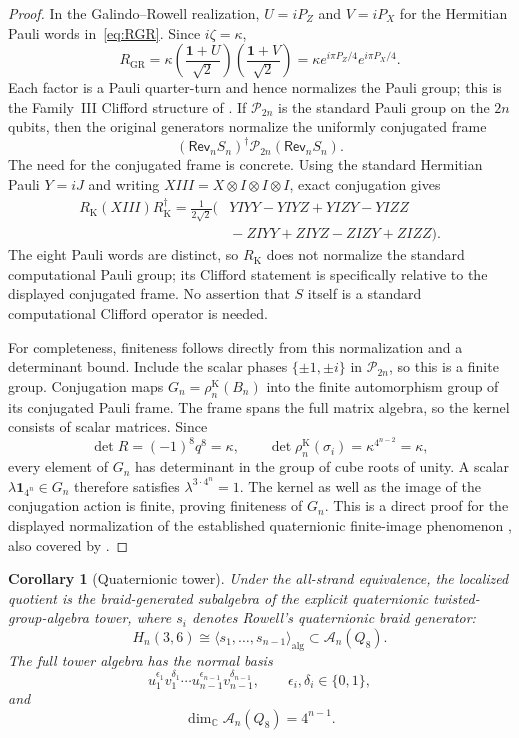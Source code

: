\documentclass[11pt]{article}
\newtheorem{corollary}[theorem]{Corollary}
\theoremstyle{remark}
\newcommand{\Id}{\mathbf 1}
\newcommand{\bbC}{\mathbb C}
\begin{document}
\begin{proof}
In the Galindo--Rowell realization, \(U=iP_Z\) and \(V=iP_X\) for the Hermitian
Pauli words in~\eqref{eq:RGR}.  Since \(i\zeta=\kappa\),
\[
  R_{\mathrm{GR}}
  =\kappa\left(\frac{\Id+U}{\sqrt2}\right)
             \left(\frac{\Id+V}{\sqrt2}\right)
  =\kappa e^{i\pi P_Z/4}e^{i\pi P_X/4}.
\]
Each factor is a Pauli quarter-turn and hence normalizes the Pauli group; this
is the Family~III Clifford structure of
\cite[Proposition~8.1]{GalindoRowell2026}.  If \(\mathcal P_{2n}\) is the
standard Pauli group on the \(2n\) qubits, then the original generators
normalize the uniformly conjugated frame
\[
  (\mathsf{Rev}_nS_n)^\dagger\mathcal P_{2n}(\mathsf{Rev}_nS_n).
\]
The need for the conjugated frame is concrete.  Using the standard Hermitian
Pauli \(Y=iJ\) and writing \(XIII=X\otimes I\otimes I\otimes I\), exact
conjugation gives
\[
\begin{aligned}
  R_{\mathrm K}(XIII)R_{\mathrm K}^\dagger
  =\frac1{2\sqrt2}\bigl(&YIYY-YIYZ+YIZY-YIZZ\\
                         &{}-ZIYY+ZIYZ-ZIZY+ZIZZ\bigr).
\end{aligned}
\]
The eight Pauli words are distinct, so \(R_{\mathrm K}\) does not normalize the
standard computational Pauli group; its Clifford statement is specifically
relative to the displayed conjugated frame.  No assertion that \(S\) itself is
a standard computational Clifford operator is needed.

For completeness, finiteness follows directly from this normalization and a
determinant bound.  Include the scalar phases \(\{\pm1,\pm i\}\) in
\(\mathcal P_{2n}\), so this is a finite group.  Conjugation maps
\(G_n=\rho_n^{\mathrm K}(B_n)\) into the finite automorphism group of its
conjugated Pauli frame.  The frame spans the full matrix algebra, so the
kernel consists of scalar matrices.  Since
\[
  \det R=(-1)^8q^8=\kappa,\qquad
  \det\rho_n^{\mathrm K}(\sigma_i)
  =\kappa^{4^{n-2}}=\kappa,
\]
every element of \(G_n\) has determinant in the group of cube roots of unity.
A scalar \(\lambda\Id_{4^n}\in G_n\) therefore satisfies
\(\lambda^{3\cdot4^n}=1\).  The kernel as well as the image of the conjugation
action is finite, proving finiteness of \(G_n\).
This is a direct proof for the displayed normalization of the established
quaternionic finite-image phenomenon
\cite[Theorem~3.1]{Rowell2011}, also covered by
\cite[Theorem~8.4]{GalindoRowell2026}.
\end{proof}

\begin{corollary}[Quaternionic tower]\label{cor:quaternionic-tower}
Under the all-strand equivalence, the localized quotient is the
braid-generated subalgebra of the explicit quaternionic twisted-group-algebra
tower, where \(s_i\) denotes Rowell's quaternionic braid generator:
\[
  H_n(3,6)\cong
  \langle s_1,\ldots,s_{n-1}\rangle_{\mathrm{alg}}
  \subset \mathcal A_n(Q_8).
\]
The full tower algebra has the normal basis
\[
  u_1^{\epsilon_1}v_1^{\delta_1}\cdots
  u_{n-1}^{\epsilon_{n-1}}v_{n-1}^{\delta_{n-1}},
  \qquad \epsilon_i,\delta_i\in\{0,1\},
\]
and
\[
  \dim_{\bbC}\mathcal A_n(Q_8)=4^{n-1}.
\]
\end{corollary}
\end{document}
